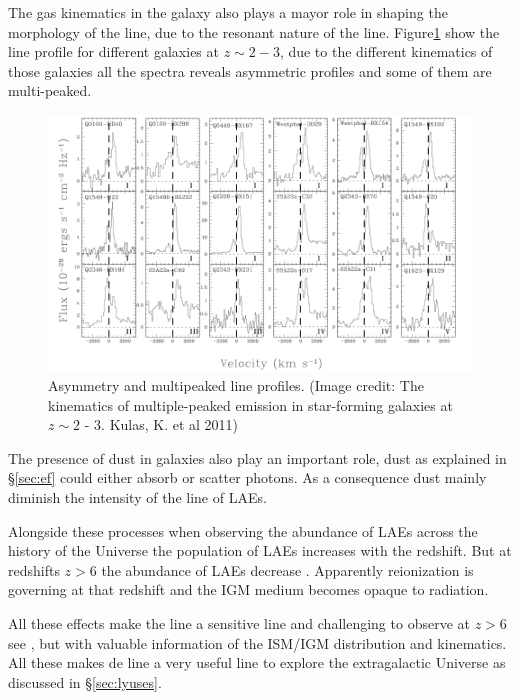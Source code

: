 The gas kinematics in the galaxy also plays a mayor role in shaping
the morphology of the line, due to the resonant nature of the line. 
Figure\ref{fig:kulas} show the \ly line
profile for different galaxies at $z \sim 2 - 3$, due to the different
kinematics of those galaxies all the spectra reveals asymmetric profiles 
and some of them are multi-peaked.    


\begin{figure}[H]%
\begin{center}
\includegraphics[scale=0.4]{../Figures/kulas.png}
\end{center}\caption{Asymmetry and multipeaked \ly line profiles. (Image credit: The kinematics of multiple-peaked \ly emission in star-forming galaxies at $z\sim 2$ - 3. Kulas, K. et al 2011)\label{fig:kulas}
 }
\end{figure}

The presence of dust in galaxies also play an important role, dust as explained
 in \S\ref{sec:ef} could either absorb or scatter \ly photons. As a 
consequence dust mainly diminish the intensity of the \ly line of LAEs. 

Alongside these processes when observing the abundance of LAEs across
the history of the Universe the population of LAEs increases 
with the redshift. But at redshifts $z>6$ the  
abundance of LAEs decrease \citep{Schenker12}. Apparently 
 reionization  is governing at that redshift and the IGM medium 
becomes opaque to \ly radiation.   

All these effects make the \ly line a sensitive line and challenging
to observe at $z>6$ see \citep{Sobral15}, but with valuable information
of the ISM/IGM distribution and kinematics. All these makes de \ly
line a very useful line to explore the extragalactic Universe as
discussed in \S\ref{sec:lyuses}.

